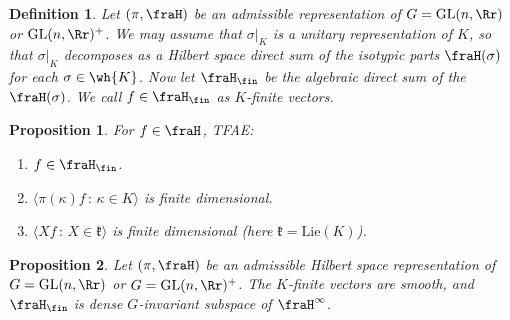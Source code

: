 \documentclass{article}
\newtheorem{definition}{Definition}[section]
\newcommand{\GL}{\mathrm{GL}}
\newtheorem{proposition}{Proposition}[section]
\begin{document}
\begin{definition}
Let $(\pi, \fraH)$ be an admissible representation of $G = \GL(n, \Rr)$ or $\GL(n, \Rr)^{+}$. 
We may assume that $\sigma|_{K}$ is a unitary representation of $K$, so that $\sigma|_{K}$ decomposes as a Hilbert space direct sum of the isotypic parts $\fraH(\sigma)$ for each $\sigma\in \wh{K}$. 
Now let $\fraH_{\fin}$ be the algebraic direct sum of the $\fraH(\sigma)$. 
We call $f\in \fraH_{\fin}$ as $K$-finite vectors. 
\end{definition}

\begin{proposition}
For $f\in \fraH$, TFAE:
\begin{enumerate}
\item $f\in \fraH_{\fin}$.
\item $\langle \pi(\kappa)f\,:\, \kappa\in K\rangle$ is finite dimensional.
\item $\langle Xf\,:\, X\in \mathfrak{k}\rangle$ is finite dimensional (here $\mathfrak{k} = \mathrm{Lie}(K)$). 
\end{enumerate}
\end{proposition}
\begin{proposition}
Let $(\pi, \fraH)$ be an admissible Hilbert space representation of $G = \GL(n, \Rr)$ or $G = \GL(n, \Rr)^{+}$. 
The $K$-finite vectors are smooth, and $\fraH_{\fin}$ is dense $G$-invariant subspace of $\fraH^{\infty}$.
\end{proposition}
\end{document}
